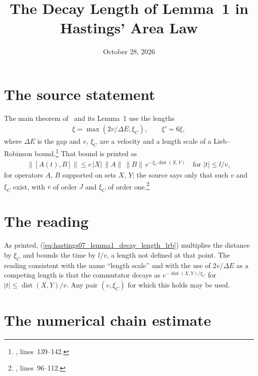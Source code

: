 \documentclass{article}
\title{The Decay Length of Lemma~1 in Hastings' Area Law}
\author{}
\date{October 28, 2026}
\begin{document}
\maketitle
{}

\section{The source statement}

The main theorem of~\cite{Hastings2007AreaLaw} and its Lemma~1 use the
lengths
\begin{align}
    \xi=\max(2v/\Delta E,\xi_C),\qquad\xi'=6\xi,
    \label{eq:hastings07_lemma1_decay_length_source}
\end{align}
where $\Delta E$ is the gap and $v$, $\xi_C$ are a velocity and a length
scale of a Lieb--Robinson bound.\footnote{,
    lines~139--142.} That bound is printed as
\begin{align}
    \|[A(t),B]\|\le c\,|X|\,\|A\|\,\|B\|\,e^{-\xi_C\operatorname{dist}(X,Y)}
    \quad\text{for }|t|\le l/v,
    \label{eq:hastings07_lemma1_decay_length_lrb}
\end{align}
for operators $A$, $B$ supported on sets $X$, $Y$; the source says only that
such $v$ and $\xi_C$ exist, with $v$ of order $J$ and $\xi_C$ of order
one.\footnote{, lines~96--112.}

\section{The reading}

As printed, (\ref{eq:hastings07_lemma1_decay_length_lrb}) multiplies the
distance by $\xi_C$ and bounds the time by $l/v$, a length not defined at
that point. The reading consistent with the name ``length scale'' and with
the use of $2v/\Delta E$ as a competing length is that the commutator decays
as $e^{-\operatorname{dist}(X,Y)/\xi_C}$ for $|t|\le\operatorname{dist}(X,Y)/v$.
Any pair $(v,\xi_C)$ for which this holds may be used.

\section{The numerical chain estimate}
\end{document}
